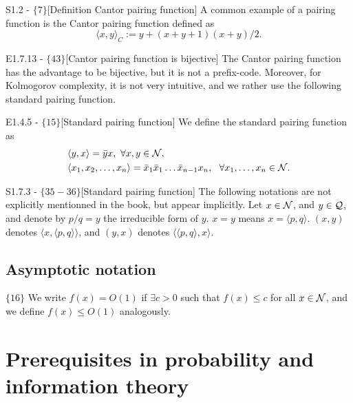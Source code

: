 \documentclass{article}
\begin{document}
\begin{flexidefinition}{S1.2 - $\{7\}$}[Definition Cantor pairing function]
    A common example of a pairing function is the Cantor pairing function defined as
\begin{equation}
    \langle x,y \rangle_C := y + (x+y+1)(x+y)/2.
\end{equation}
\end{flexidefinition}


\begin{flexilemma}{E1.7.13 - $\{43\}$}[Cantor pairing function is bijective]
    The Cantor pairing function has the advantage to be bijective, but it is not a prefix-code. Moreover, for Kolmogorov complexity, it is not very intuitive, and we rather use the following standard pairing function.
\end{flexilemma}

\begin{flexidefinition}{E1.4.5 - $\{15\}$}[Standard pairing function]
 We define the standard pairing function as
    \begin{align}
        & \langle y,x \rangle = \bar y x, \  \forall x,y \in \mathcal{N},\\  
        & \langle x_1, x_2, \ldots, x_n \rangle = \bar x_1 \bar x_1 \ldots \bar x_{n-1} x_n, \ \  \forall x_1,\ldots,x_n \in \mathcal{N}.
    \end{align}
    
\end{flexidefinition}

\begin{flexidefinition}{S1.7.3 - $\{35-36\}$}[Standard pairing function]
    The following notations are not explicitly mentionned in the book, but appear implicitly. Let $x \in \mathcal{N}$, and $y \in \mathcal{Q}$, and denote by $p/q = y$ the irreducible form of $y$. $x = y$ means $x = \langle p,q \rangle$. $(x,y)$ denotes $\langle x, \langle p,q \rangle \rangle$, and $(y,x)$ denotes $\langle \langle p,q \rangle, x \rangle$.
\end{flexidefinition}



\subsection{Asymptotic notation}

$\{16\}$ We write $f(x) = O(1)$ if $\exists c > 0$ such that $f(x) \leq c$ for all $x \in \mathcal{N}$, and we define $f(x) \leq O(1)$ analogously. 

\section{Prerequisites in probability and information theory}
\end{document}
